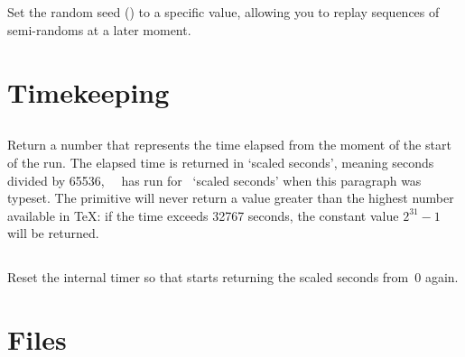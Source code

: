 \documentclass{pdftexmanual}
\begin{document}
\subsection{}

Set the random seed () to a specific value,
allowing you to replay sequences of semi-randoms at a later moment.

\section{Timekeeping}

\subsection{}

Return a number that represents the time elapsed from the moment of the
start of the run. The elapsed time is returned in `scaled seconds',
meaning seconds divided by 65536, \eg\ \PDFTEX\ has run for
\the\pdfelapsedtime\ `scaled seconds' when this paragraph was typeset.
The primitive will never return a value greater than the highest number
available in \TeX: if the time exceeds 32767 seconds, the constant value
$2^{31}-1$ will be returned. 

\subsection{}

Reset the internal timer so that 
starts returning the scaled seconds from~0 again. 

\section{Files}

\subsection{}
\end{document}

